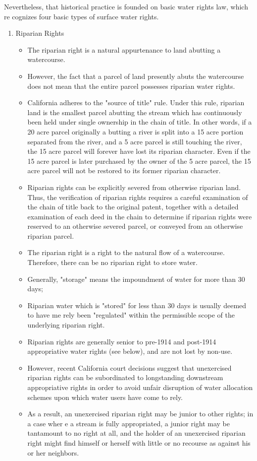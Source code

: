 \documentclass{article}
\begin{document}
\begin{enumerate}
\begin{itemize}
Nevertheless, that historical practice is founded on basic water rights law, which re cognizes four basic types of surface water rights. 
\begin{enumerate}
\item Riparian Rights\\
\begin{itemize}
\item The riparian right is a natural appurtenance to land abutting a watercourse. 
\item However, the fact that a parcel of land presently abuts the watercourse does not mean that the entire parcel possesses riparian water rights. 
\item California adheres to the "source of title" rule. Under this rule, riparian land is the smallest parcel abutting the stream which has continuously been held under single ownership in the chain of title. In other words, if a 20 acre parcel originally a butting a river is split into a 15 acre portion separated from the river, and a 5 acre parcel is still touching the river, the 15 acre parcel will forever have lost its riparian character. Even if the 15 acre parcel is later purchased by the owner of the 5 acre parcel, the 15 acre parcel will not be restored to its former riparian character. 
\item Riparian rights can be explicitly severed from otherwise riparian land. Thus, the verification of riparian rights requires a careful examination of the chain of title back to the original patent, together with a detailed examination of each deed in the chain to determine if riparian rights were reserved to an otherwise severed parcel, or conveyed from an otherwise riparian parcel. 
\item The riparian right is a right to the natural flow of a watercourse. Therefore, there can be no riparian right to store water. 
\item Generally, "storage" means the impoundment of water for more than 30 days; 
\item Riparian water which is "stored" for less than 30 days is usually deemed to have me rely been "regulated" within the permissible scope of the underlying riparian right. \item Riparian rights are generally senior to pre-1914 and post-1914 appropriative water rights (see below), and are not lost by non-use. 
\item However, recent California court decisions suggest that unexercised riparian rights can be subordinated to longstanding downstream appropriative rights in order to avoid unfair disruption of water allocation schemes upon which water users have come to rely. \item As a result, an unexercised riparian right may be junior to other rights; in a case wher e a stream is fully appropriated, a junior right may be tantamount to no right at all, and the holder of an unexercised riparian right might find himself or herself with little or no recourse as against his or her neighbors. 

\end{itemize}
\end{enumerate}
\end{itemize}
\end{enumerate}
\end{document}

